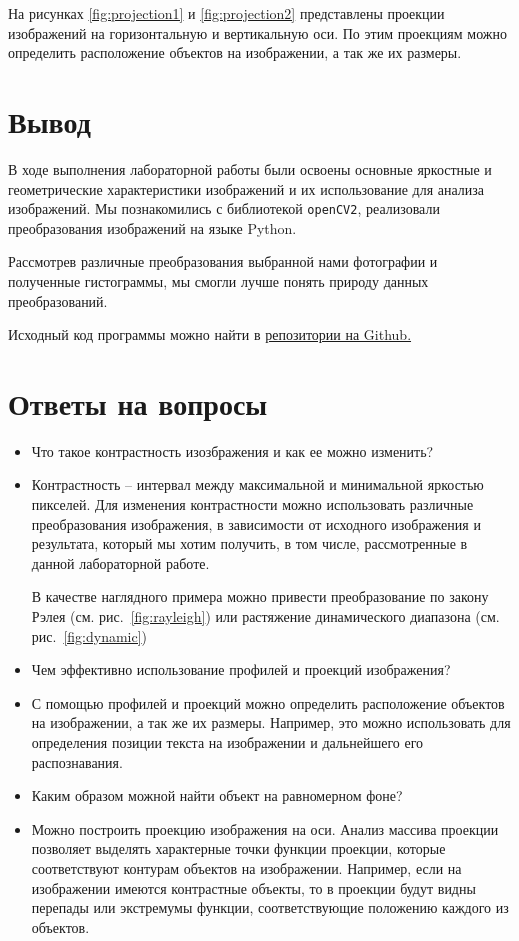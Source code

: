 На рисунках \ref{fig:projection1} и \ref{fig:projection2} представлены проекции изображений на горизонтальную и вертикальную оси. 
По этим проекциям можно определить расположение объектов на изображении, а так же их размеры.

\newpage\clearpage
\section{Вывод}

В ходе выполнения лабораторной работы были освоены основные яркостные и геометрические
характеристики изображений и их использование для анализа изображений. 
Мы познакомились с библиотекой \texttt{openCV2}, реализовали преобразования изображений на языке Python. 

Рассмотрев различные преобразования выбранной нами фотографии и полученные гистограммы, мы смогли лучше понять природу данных преобразований. 



Исходный код программы можно найти в \href{https://github.com/edelwiw/TechVision_Lab1}{репозитории на Github.}

\section{Ответы на вопросы}

\setcounter{question}{0}

\newcommand{\question}[1]{\item[Q\refstepcounter{question}\thequestion.] #1}
\newcommand{\answer}[1]{\item[A\thequestion.] #1}

\begin{itemize}

\question{Что такое контрастность изозбражения и как ее можно изменить?}
\answer{Контрастность -- интервал между максимальной и минимальной яркостью пикселей. 
Для изменения контрастности можно использовать различные преобразования изображения, 
в зависимости от исходного изображения и результата, который мы хотим получить,
в том числе, рассмотренные в данной лабораторной работе.

В качестве наглядного примера можно привести преобразование по закону Рэлея (см. рис.~\ref{fig:rayleigh}) или растяжение динамического диапазона (см. рис.~\ref{fig:dynamic})
}
\question{Чем эффективно использование профилей и проекций изображения?}
\answer{С помощью профилей и проекций можно определить расположение объектов на изображении, 
а так же их размеры. Например, это можно использовать для определения позиции текста на изображении и 
дальнейшего его распознавания.}

\question{Каким образом можной найти объект на равномерном фоне?}
\answer{Можно построить проекцию изображения на оси. Анализ массива проекции позволяет выделять 
характерные точки функции проекции, которые соответствуют контурам объектов на изображении. 
Например, если на изображении имеются контрастные объекты, то в проекции будут видны 
перепады или экстремумы функции, соответствующие положению каждого из объектов.}

\end{itemize}




